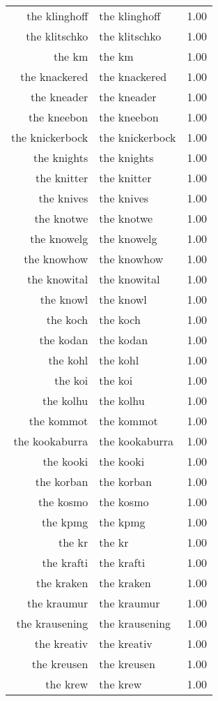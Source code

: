 \begin{table}[ht]
\begin{tabular}{rlr}
  the klinghoff & the klinghoff & 1.00 \\ 
  the klitschko & the klitschko & 1.00 \\ 
  the km & the km & 1.00 \\ 
  the knackered & the knackered & 1.00 \\ 
  the kneader & the kneader & 1.00 \\ 
  the kneebon & the kneebon & 1.00 \\ 
  the knickerbock & the knickerbock & 1.00 \\ 
  the knights & the knights & 1.00 \\ 
  the knitter & the knitter & 1.00 \\ 
  the knives & the knives & 1.00 \\ 
  the knotwe & the knotwe & 1.00 \\ 
  the knowelg & the knowelg & 1.00 \\ 
  the knowhow & the knowhow & 1.00 \\ 
  the knowital & the knowital & 1.00 \\ 
  the knowl & the knowl & 1.00 \\ 
  the koch & the koch & 1.00 \\ 
  the kodan & the kodan & 1.00 \\ 
  the kohl & the kohl & 1.00 \\ 
  the koi & the koi & 1.00 \\ 
  the kolhu & the kolhu & 1.00 \\ 
  the kommot & the kommot & 1.00 \\ 
  the kookaburra & the kookaburra & 1.00 \\ 
  the kooki & the kooki & 1.00 \\ 
  the korban & the korban & 1.00 \\ 
  the kosmo & the kosmo & 1.00 \\ 
  the kpmg & the kpmg & 1.00 \\ 
  the kr & the kr & 1.00 \\ 
  the krafti & the krafti & 1.00 \\ 
  the kraken & the kraken & 1.00 \\ 
  the kraumur & the kraumur & 1.00 \\ 
  the krausening & the krausening & 1.00 \\ 
  the kreativ & the kreativ & 1.00 \\ 
  the kreusen & the kreusen & 1.00 \\ 
  the krew & the krew & 1.00 \\ 

\end{tabular}
\end{table}
